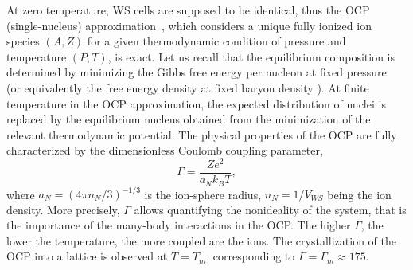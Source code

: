 At zero temperature, WS cells are supposed to be identical, thus the OCP  
(single-nucleus) approximation~\cite{Baus1980}, which considers a unique 
fully ionized ion species $(A,Z)$ for a given thermodynamic condition of 
pressure and temperature $(P,T)$, is exact. 
Let us recall that the equilibrium composition is determined by minimizing the 
Gibbs free energy per nucleon at fixed pressure~\cite{BPS} (or equivalently the 
free energy density at fixed baryon 
density \cite{Lattimer1991,Gulminelli2015,Carreau2019}).
At finite temperature in the OCP approximation, the expected distribution of 
nuclei is replaced by the equilibrium nucleus obtained from the minimization of 
the relevant thermodynamic potential.
The physical properties of the OCP are fully characterized by the 
dimensionless Coulomb coupling parameter,
%
\begin{equation}
  \Gamma = \frac{Ze^2}{a_N k_B T},\label{eq:gamma}
\end{equation}
%
where $a_N=(4\pi n_N/3)^{-1/3}$ is the ion-sphere radius, $n_N=1/V_{WS}$ being 
the ion density.
More precisely, $\Gamma$ allows quantifying the nonideality of the system, that
is the importance of the many-body interactions in the OCP. The higher
$\Gamma$, the lower the temperature, the more coupled are the ions. 
The crystallization of the OCP into a lattice is observed at $T=T_m$, 
corresponding to $\Gamma = \Gamma_m \approx 175$.

